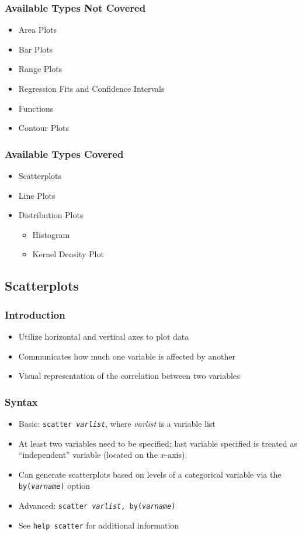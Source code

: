 \documentclass{beamer}
\begin{document}
\begin{frame}
	\frametitle{Available Types Not Covered}
		\begin{itemize}
			\item Area Plots
			\item Bar Plots
			\item Range Plots
			\item Regression Fits and Confidence Intervals
			\item Functions
			\item Contour Plots
		\end{itemize}
\end{frame}

\begin{frame}
	\frametitle{Available Types Covered}
		\begin{itemize}
			\item Scatterplots
			\item Line Plots
			\item Distribution Plots
				\begin{itemize}
					\item Histogram
					\item Kernel Density Plot
				\end{itemize}
		\end{itemize}
\end{frame}

\subsection{Scatterplots}

\begin{frame}
	\frametitle{Introduction}
		\begin{itemize}
			\item Utilize horizontal and vertical axes to plot data
			\item Communicates how much one variable is affected by another
			\item Visual representation of the correlation between two variables
		\end{itemize}
\end{frame}

\begin{frame}
	\frametitle{Syntax}
		\begin{itemize}
			\item Basic: \texttt{scatter \textit{varlist}}, where \textit{varlist} is a variable list
			\item At least two variables need to be specified; last variable specified is treated as ``independent'' variable (located on the $x$-axis).
			\item Can generate scatterplots based on levels of a categorical variable via the \texttt{by(\textit{varname})} option
			\item Advanced: \texttt{scatter \textit{varlist}, by(\textit{varname})}
			\item See \texttt{help scatter} for additional information
		\end{itemize}
\end{frame}
\end{document}
